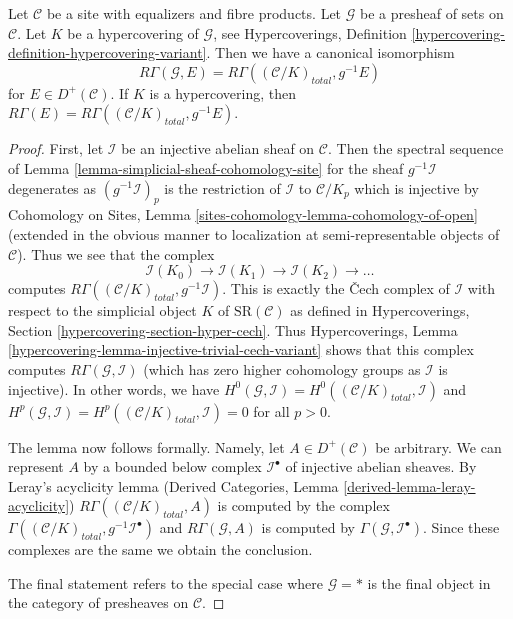 \begin{lemma}
\label{lemma-compare-cohomology-hypercovering}
Let $\mathcal{C}$ be a site with equalizers and fibre products.
Let $\mathcal{G}$ be a presheaf of sets on
$\mathcal{C}$. Let $K$ be a hypercovering of $\mathcal{G}$, see
Hypercoverings, Definition
\ref{hypercovering-definition-hypercovering-variant}.
Then we have a canonical isomorphism
$$
R\Gamma(\mathcal{G}, E) =
R\Gamma((\mathcal{C}/K)_{total}, g^{-1}E)
$$
for $E \in D^+(\mathcal{C})$. If $K$ is a
hypercovering, then
$R\Gamma(E) = R\Gamma((\mathcal{C}/K)_{total}, g^{-1}E)$.
\end{lemma}

\begin{proof}
First, let $\mathcal{I}$ be an injective abelian sheaf on $\mathcal{C}$.
Then the spectral sequence of
Lemma \ref{lemma-simplicial-sheaf-cohomology-site}
for the sheaf $g^{-1}\mathcal{I}$ degenerates as
$(g^{-1}\mathcal{I})_p$ is the restriction of $\mathcal{I}$
to $\mathcal{C}/K_p$ which is injective by
Cohomology on Sites, Lemma \ref{sites-cohomology-lemma-cohomology-of-open}
(extended in the obvious manner to localization at
semi-representable objects of $\mathcal{C}$).
Thus we see that the complex
$$
\mathcal{I}(K_0) \to \mathcal{I}(K_1) \to \mathcal{I}(K_2) \to \ldots
$$
computes $R\Gamma((\mathcal{C}/K)_{total}, g^{-1}\mathcal{I})$.
This is exactly the {\v C}ech complex of $\mathcal{I}$ with respect
to the simplicial object $K$ of $\text{SR}(\mathcal{C})$ as defined in
Hypercoverings, Section \ref{hypercovering-section-hyper-cech}.
Thus
Hypercoverings, Lemma \ref{hypercovering-lemma-injective-trivial-cech-variant}
shows that this complex computes $R\Gamma(\mathcal{G}, \mathcal{I})$
(which has zero higher cohomology groups as $\mathcal{I}$ is injective).
In other words, we have
$H^0(\mathcal{G}, \mathcal{I}) = H^0((\mathcal{C}/K)_{total}, \mathcal{I})$
and
$H^p(\mathcal{G}, \mathcal{I}) = H^p((\mathcal{C}/K)_{total}, \mathcal{I}) = 0$
for all $p > 0$.

\medskip\noindent
The lemma now follows formally. Namely, let $A \in D^+(\mathcal{C})$
be arbitrary. We can represent $A$ by a bounded below complex
$\mathcal{I}^\bullet$ of injective abelian sheaves. By Leray's acyclicity
lemma (Derived Categories, Lemma \ref{derived-lemma-leray-acyclicity})
$R\Gamma((\mathcal{C}/K)_{total}, A)$
is computed by the complex
$\Gamma((\mathcal{C}/K)_{total}, g^{-1}\mathcal{I}^\bullet)$
and $R\Gamma(\mathcal{G}, A)$ is computed by
$\Gamma(\mathcal{G}, \mathcal{I}^\bullet)$.
Since these complexes are the same we obtain the conclusion.

\medskip\noindent
The final statement refers to the special case where $\mathcal{G} = *$
is the final object in the category of presheaves on $\mathcal{C}$.
\end{proof}

